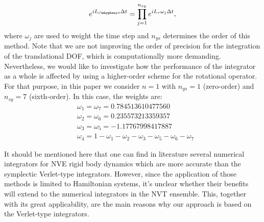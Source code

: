 \documentclass[aip,jcp,reprint,amsmath,amssymb]{revtex4-1}
\begin{document}
\begin{equation}
\label{eq:ys_rot}
e^{i L_{\mathrm{r\mhyphen ys}} \Delta t} = \prod_{j=1}^{n_{sy}} e^{i L_{r} \omega_j \Delta t},
\end{equation}
where $\omega_j$ are used to weight the time step and $n_{ys}$ determines the order of this method. Note that we are not improving the order of precision for the integration of the translational DOF, which is computationally more demanding. Nevertheless, we would like to investigate how the performance of the integrator as a whole is affected by using a higher-order scheme for the rotational operator. For that purpose, in this paper we consider $n = 1$ with $n_{ys} = 1 $ (zero-order) and $n_{sy} = 7$ (sixth-order). In this case, the weights are:
\begin{align*}
&\omega_1 = \omega_7 = 0.784513610477560 \\
&\omega_2 = \omega_6 = 0.235573213359357 \\
&\omega_3 = \omega_5 = -1.17767998417887 \\
&\omega_4 = 1 - \omega_1 -\omega_2 - \omega_3 - \omega_5 - \omega_6 - \omega_7
\end{align*}

It should be mentioned here that one can find in literature several numerical integrators\cite{Omelyan2007,Omelyan2008,vanZon2008} for NVE rigid body dynamics which are more accurate than the symplectic Verlet-type integrators. However, since the application of those methods is limited to Hamiltonian systems, it's unclear whether their benefits will extend to the numerical integrators in the NVT ensemble. This, together with its great applicability, are the main reasons why our approach is based on the Verlet-type integrators.
\end{document}
